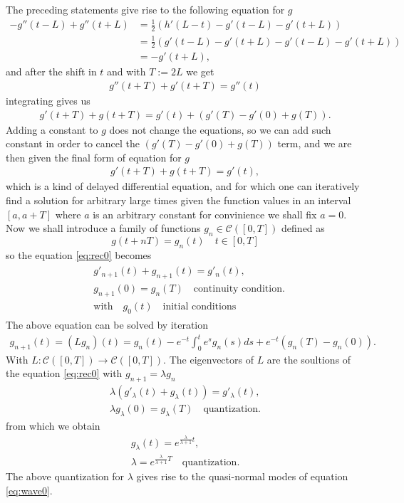 \documentclass[
a4paper,%
10pt,%
titlepage,%
twoside%
]{article}
\begin{document}
The preceding statements give rise to the following equation for $g$
\begin{equation}
  \begin{split}
    -g''(t-L)+g''(t+L)&=\frac{1}{2}(h'(L-t)-g'(t-L)-g'(t+L))\\
    &=\frac{1}{2}(g'(t-L)-g'(t+L)-g'(t-L)-g'(t+L))\\
    &=-g'(t+L),
  \end{split}
\end{equation}
and after the shift in $t$ and with $T:=2L$ we get
\begin{gather}
  g''(t+T)+g'(t+T)=g''(t)
\end{gather}
integrating gives us
\begin{gather}
  g'(t+T)+g(t+T)=g'(t)+(g'(T)-g'(0)+g(T)).
\end{gather}
Adding a constant to $g$ does not change the equations, so we can
add such constant in order to cancel the $(g'(T)-g'(0)+g(T))$ term,
and we are then given the final form of equation for $g$
\begin{gather}
  \label{eq:dde}
  g'(t+T)+g(t+T)=g'(t),
\end{gather}
which is a kind of delayed differential equation, and for which one
can iteratively find a solution for arbitrary large times given the
function values in an interval $[a,a+T]$ where $a$ is an arbitrary
constant for convinience we shall fix $a=0$. Now we shall introduce a
family of functions $g_n\in\mathcal{C}([0,T])$ defined as
\begin{equation}
    g(t+nT)=g_n(t)\quad t\in[0,T]
\end{equation}
so the equation \eqref{eq:rec0} becomes
\begin{gather}
  \label{eq:rec0}
  \begin{split}
    &g'_{n+1}(t)+g_{n+1}(t)=g'_n(t),\\
    &g_{n+1}(0)=g_n(T)\quad\text{continuity condition}.\\
    &\text{with}\quad g_0(t)\quad\text{initial conditions}
  \end{split}
\end{gather}
The above equation can be solved by iteration
\begin{gather}
  g_{n+1}(t)=(Lg_n)(t)=g_n(t)-e^{-t}\int_0^t e^s g_n(s)ds+e^{-t}(g_n(T)-g_n(0)).
\end{gather}
With $L:\mathcal{C}([0,T])\rightarrow \mathcal{C}([0,T])$. The
eigenvectors of $L$ are the soultions of the equation \eqref{eq:rec0}
with $g_{n+1}=\lambda g_n$
\begin{gather}
  \lambda(g'_\lambda(t)+g_\lambda(t))=g'_\lambda(t),\\
  \lambda g_\lambda(0)=g_\lambda(T)\quad\text{quantization}.
\end{gather}
from which we obtain
\begin{gather}
  g_\lambda(t)=e^{\frac{\lambda}{\lambda+1}t},\\
  \lambda=e^{\frac{\lambda}{\lambda+1}T}\quad\text{quantization}.
\end{gather}
The above quantization for $\lambda$ gives rise to the quasi-normal
modes of equation \eqref{eq:wave0}.
\end{document}
